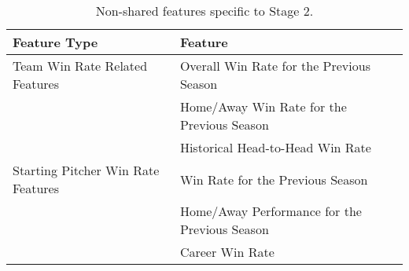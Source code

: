 \documentclass[12pt,a4paper]{article}
\begin{document}
\begin{table}[h!]
\centering
\small
\begin{tabular}{p{} p{}}
\toprule
\textbf{Feature Type}          & \textbf{Feature}                            \\
\midrule
Team Win Rate Related Features & Overall Win Rate for the Previous Season    \\
                                & Home/Away Win Rate for the Previous Season  \\
                                & Historical Head-to-Head Win Rate            \\
Starting Pitcher Win Rate Features & Win Rate for the Previous Season       \\
                                & Home/Away Performance for the Previous Season \\
                                & Career Win Rate                             \\
\bottomrule
\end{tabular}
\caption{Non-shared features specific to Stage 2.}
\label{tab:non_shared_stage2}
\end{table}





\end{document}
